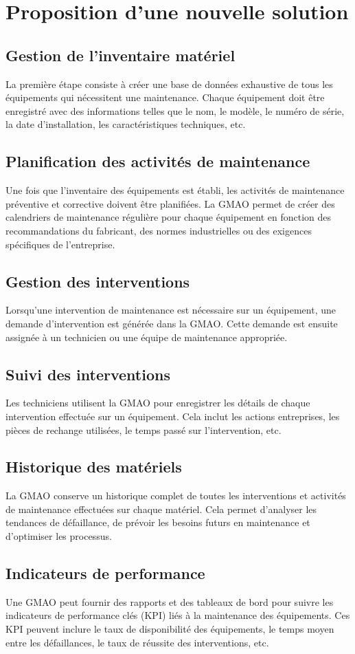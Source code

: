 \section{Proposition d'une nouvelle solution}
\subsection{Gestion de l'inventaire matériel}
La première étape consiste à créer une base de données exhaustive de tous les équipements 
qui nécessitent une maintenance. Chaque équipement doit être enregistré avec des 
informations telles que le nom, le modèle, le numéro de série, la date d'installation, 
les caractéristiques techniques, etc.
\subsection{Planification des activités de maintenance}
Une fois que l'inventaire des équipements est établi, les activités de maintenance 
préventive et corrective doivent être planifiées. La GMAO permet de créer des 
calendriers de maintenance régulière pour chaque équipement en fonction des 
recommandations du fabricant, des normes industrielles ou des exigences spécifiques 
de l'entreprise.
\subsection{Gestion des interventions}
Lorsqu'une intervention de maintenance est nécessaire sur un équipement, une demande 
d'intervention est générée dans la GMAO. Cette demande est ensuite assignée à un 
technicien ou une équipe de maintenance appropriée.
\subsection{Suivi des interventions}
Les techniciens utilisent la GMAO pour enregistrer les détails de chaque intervention 
effectuée sur un équipement. Cela inclut les actions entreprises, les pièces de 
rechange utilisées, le temps passé sur l'intervention, etc.
\subsection{Historique des matériels}
La GMAO conserve un historique complet de toutes les interventions et activités de
 maintenance effectuées sur chaque matériel. Cela permet d'analyser les 
 tendances de défaillance, de prévoir les besoins futurs en maintenance et 
 d'optimiser les processus.
\subsection{Indicateurs de performance}
Une GMAO peut fournir des rapports et des tableaux de bord pour suivre les indicateurs 
de performance clés (KPI) liés à la maintenance des équipements. Ces KPI peuvent 
inclure le taux de disponibilité des équipements, le temps moyen entre les défaillances, 
le taux de réussite des interventions, etc.

